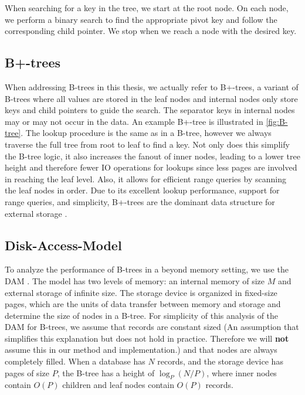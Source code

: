 When searching for a key in the tree, we start at the root node.
On each node, we perform a binary search to find the appropriate pivot key and follow the corresponding child pointer.
We stop when we reach a node with the desired key.

\subsection*{B+-trees}
When addressing B-trees in this thesis, we actually refer to B+-trees, a variant of B-trees where all values are stored in the leaf nodes and internal nodes only store keys and child pointers to guide the search.
The separator keys in internal nodes may or may not occur in the data. An example B+-tree is illustrated in \autoref{fig:B-tree}.
The lookup procedure is the same as in a B-tree, however we always traverse the full tree from root to leaf to find a key.
Not only does this simplify the B-tree logic, it also increases the fanout of inner nodes, leading to a lower tree height and therefore fewer \ac{IO} operations for lookups since less pages are involved in reaching the leaf level.
Also, it allows for efficient range queries by scanning the leaf nodes in order.
Due to its excellent lookup performance, support for range queries, and simplicity, B+-trees are the dominant data structure for external storage \cite{mdbs2024slides}.

\subsection*{Disk-Access-Model}
To analyze the performance of B-trees in a beyond memory setting, we use the \ac{DAM} \cite{aggarwal1988complexity} \cite{kuszmaul2014fractal}.
The model has two levels of memory: an internal memory of size $M$ and external storage of infinite size.
The storage device is organized in fixed-size pages, which are the units of data transfer between memory and storage and determine the size of nodes in a B-tree.
For simplicity of this analysis of the \ac{DAM} for B-trees, we assume that records are constant sized (An assumption that simplifies this explanation but does not hold in practice. 
Therefore we will \textbf{not} assume this in our method and implementation.) and that nodes are always completely filled.
When a database has $N$ records, and the storage device has pages of size $P$, the B-tree has a height of $\log_P(N/P)$, where inner nodes contain $O(P)$ children and leaf nodes contain $O(P)$ records.

